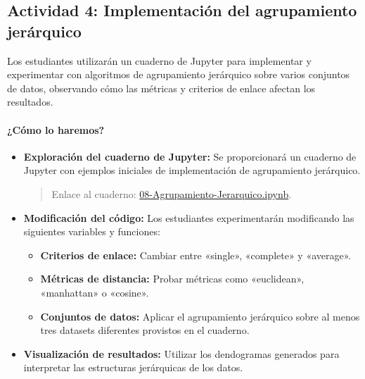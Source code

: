 \documentclass[a4,11pt]{aleph-notas}
\begin{document}
\subsection*{Actividad 4: Implementación del agrupamiento jerárquico}

Los estudiantes utilizarán un cuaderno de Jupyter para implementar y experimentar con algoritmos de agrupamiento jerárquico sobre varios conjuntos de datos, observando cómo las métricas y criterios de enlace afectan los resultados.

\paragraph{¿Cómo lo haremos?}  
\begin{itemize}[leftmargin=*]
    \item \textbf{Exploración del cuaderno de Jupyter:}  
    Se proporcionará un cuaderno de Jupyter con ejemplos iniciales de implementación de agrupamiento jerárquico.
    \begin{quote}
        Enlace al cuaderno: \href{https://colab.research.google.com/github/andres-merino/AprendizajeAutomaticoInicial-05-N0105/blob/main/2-Notebooks/08-Agrupamiento-Jerarquico.ipynb}{08-Agrupamiento-Jerarquico.ipynb}.
    \end{quote}

    \item \textbf{Modificación del código:}  
    Los estudiantes experimentarán modificando las siguientes variables y funciones:
    \begin{itemize}
        \item \textbf{Criterios de enlace:} Cambiar entre «single», «complete» y «average».
        \item \textbf{Métricas de distancia:} Probar métricas como «euclidean», «manhattan» o «cosine».
        \item \textbf{Conjuntos de datos:} Aplicar el agrupamiento jerárquico sobre al menos tres datasets diferentes provistos en el cuaderno.
    \end{itemize}

    \item \textbf{Visualización de resultados:}  
    Utilizar los dendogramas generados para interpretar las estructuras jerárquicas de los datos.
\end{itemize}
\end{document}
